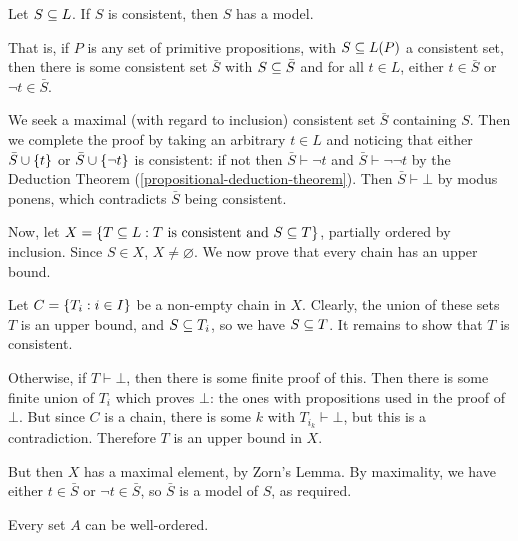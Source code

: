 \documentclass{article}
\begin{document}
\begin{theorem}
	\label{general-model-existence-lemma}
    Let $S \subseteq L$. If $S$ is consistent, then $S$ has a model.
    
    That is, if $P$ is any set of primitive propositions, with $S \subseteq L(P)$ a consistent set, then there is some consistent set $\bar S$ with $S \subseteq \bar S$ and for all $t \in L$, either $t \in \bar S$ or $\lnot t \in \bar S$.
\end{theorem}

\begin{prf}
    We seek a maximal (with regard to inclusion) consistent set $\bar S$ containing $S$. Then we complete the proof by taking an arbitrary $t \in L$ and noticing that either $\bar S \cup \left\lbrace t \right\rbrace$ or $\bar S \cup \left\lbrace \lnot t \right\rbrace$ is consistent: if not then $\bar S \vdash \lnot t$ and $\bar S \vdash \lnot \lnot t$ by the Deduction Theorem (\ref{propositional-deduction-theorem}). Then $\bar S \vdash \bot$ by modus ponens, which contradicts $\bar S$ being consistent.
    
    Now, let $X = \left\lbrace T \subseteq L : T \text{ is consistent and } S \subseteq T \right\rbrace$, partially ordered by inclusion. Since $S \in X$, $X \neq \varnothing$. We now prove that every chain has an upper bound.
    
    Let $C = \left\lbrace T_i : i \in I \right\rbrace$ be a non-empty chain in $X$. Clearly, the union of these sets $T$ is an upper bound, and $S \subseteq T_i$, so we have $S \subseteq T$. It remains to show that $T$ is consistent.
    
    Otherwise, if $T \vdash \bot$, then there is some finite proof of this. Then there is some finite union of $T_i$ which proves $\bot$: the ones with propositions used in the proof of $\bot$. But since $C$ is a chain, there is some $k$ with $T_{i_k} \vdash \bot$, but this is a contradiction. Therefore $T$ is an upper bound in $X$.
    
	But then $X$ has a maximal element, by Zorn's Lemma. By maximality, we have either $t \in \bar S$ or $\lnot t \in \bar S$, so $\bar S$ is a model of $S$, as required.
\end{prf}

\begin{theorem}
	\label{well-ordering-principle}
    Every set $A$ can be well-ordered.
\end{theorem}
\end{document}
